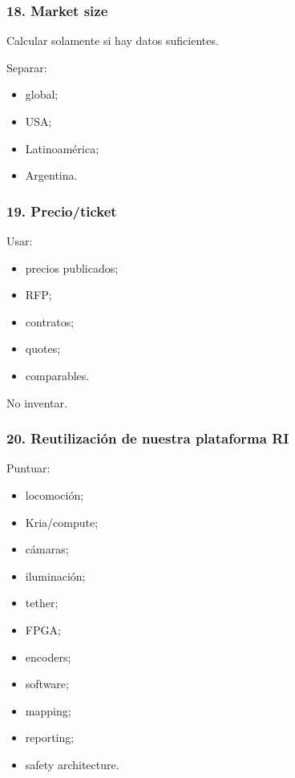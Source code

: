 \documentclass[11pt,a4paper]{article}
\begin{document}
\subsubsection*{18. Market size}
Calcular solamente si hay datos suficientes.

Separar:

\begin{itemize}
\item global;
\item USA;
\item Latinoamérica;
\item Argentina.
\end{itemize}


\subsubsection*{19. Precio/ticket}
Usar:

\begin{itemize}
\item precios publicados;
\item RFP;
\item contratos;
\item quotes;
\item comparables.
\end{itemize}

No inventar.


\subsubsection*{20. Reutilización de nuestra plataforma RI}
Puntuar:

\begin{itemize}
\item locomoción;
\item Kria/compute;
\item cámaras;
\item iluminación;
\item tether;
\item FPGA;
\item encoders;
\item software;
\item mapping;
\item reporting;
\item safety architecture.
\end{itemize}
\end{document}
